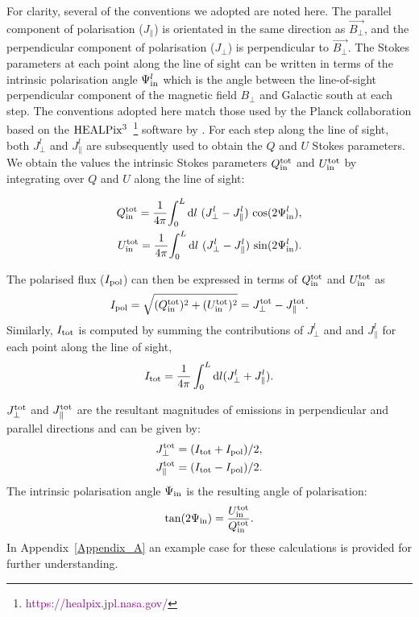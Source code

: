 \documentclass[usenatbib]{mnras}
\begin{document}
For clarity, several of the conventions we adopted are noted here. The parallel component of polarisation (${J_{\parallel}}$) is orientated in the same direction as  $\vec{B_{\perp}}$, and the perpendicular component of polarisation (${J_{\perp}}$) is perpendicular to $\vec{B_{\perp}}$. The Stokes parameters at each point along the line of sight can be written in terms of the intrinsic polarisation angle $\Psi^l_{\rm in}$ which is the angle between the line-of-sight perpendicular component of the magnetic field $B_{\perp}$ and Galactic south at each step. The conventions adopted here match those used by the Planck collaboration \citep{Planck_XIX} based on the $\rm HEALPix^3$~\footnote{\textcolor{purple}{https://healpix.jpl.nasa.gov/}} software by \cite{Healpix_2005}. For each step along the line of sight, both  ${J_{\perp}^l}$ and ${J_{\parallel}^l}$ are subsequently used to obtain the $Q$ and $U$ Stokes parameters. We obtain the values the intrinsic Stokes parameters $Q^{\rm tot}_{\rm in}$ and $U^{\rm tot}_{\rm in}$ by integrating over $Q$ and $U$ along the line of sight:

\begin{eqnarray}
Q_{\rm in}^{\rm tot} = \frac{1}{4\pi} {\int_0^L \mathrm{d}l \ ({J_{\perp}^l} - J_{\parallel}^l) \ {\cos}(2\Psi^l_{\rm in}) }, \\
U_{\rm in}^{\rm tot} =\frac{1}{4\pi} {\int_0^L \mathrm{d}l \ ({J_{\perp}^l} - J_{\parallel}^l) \ {\sin}(2\Psi^l_{\rm in})}.
\end{eqnarray}

The polarised flux ($I_{\rm pol}$) can then be expressed in terms of ${Q_{\rm in}^{\rm tot}}$ and ${U_{\rm in}^{\rm tot}}$ as
\begin{eqnarray} \label{eq_I_pol}
I_{\rm pol} = \sqrt{(Q_{\rm in}^{\rm tot})^2+(U_{\rm in}^{\rm tot})^2} = J_{\perp}^{\rm tot} - J_{\parallel}^{\rm tot}.
\end{eqnarray}
Similarly, $I_{\rm tot}$ is computed by summing the contributions of $J_{\perp}^l$ and and $J_{\parallel}^l$ for each point along the line of sight,
\begin{equation} \label{eq_I_tot}
    I_{\rm tot} = \frac{1}{4\pi} \int_0^L \mathrm{d}l (J_{\perp}^l + J_{\parallel}^l).
\end{equation}

$J_{\perp}^{\rm tot}$ and $J_{\parallel}^{\rm tot}$ are the resultant magnitudes of emissions in perpendicular and parallel directions and can be given by:
\begin{eqnarray}
J_{\perp}^{\rm tot} = (I_{\rm tot} + I_{\rm pol})/2, \\
J_{\parallel}^{\rm tot} = (I_{\rm tot} - I_{\rm pol})/2. 
\end{eqnarray}
The intrinsic polarisation angle $\Psi_{\rm in}$ is the resulting angle of polarisation:
\begin{eqnarray}
\tan(2\Psi_{\rm in}) = \frac{U_{\rm in}^{\rm tot}}{Q_{\rm in}^{\rm tot}}. 
\end{eqnarray}
In Appendix~\ref{Appendix_A} an example case for these calculations is provided for further understanding.
\end{document}
